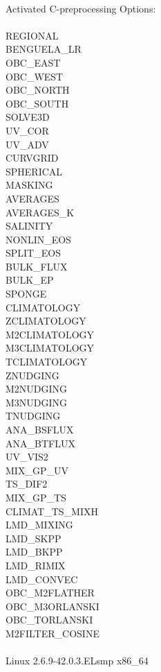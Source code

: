 \\
Activated C-preprocessing Options:\\
\\
REGIONAL\\
BENGUELA\_LR\\
OBC\_EAST\\
OBC\_WEST\\
OBC\_NORTH\\
OBC\_SOUTH\\
SOLVE3D\\
UV\_COR\\
UV\_ADV\\
CURVGRID\\
SPHERICAL\\
MASKING\\
AVERAGES\\
AVERAGES\_K\\
SALINITY\\
NONLIN\_EOS\\
SPLIT\_EOS\\
BULK\_FLUX\\
BULK\_EP\\
SPONGE\\
CLIMATOLOGY\\
ZCLIMATOLOGY\\
M2CLIMATOLOGY\\
M3CLIMATOLOGY\\
TCLIMATOLOGY\\
ZNUDGING\\
M2NUDGING\\
M3NUDGING\\
TNUDGING\\
ANA\_BSFLUX\\
ANA\_BTFLUX\\
UV\_VIS2\\
MIX\_GP\_UV\\
TS\_DIF2\\
MIX\_GP\_TS\\
CLIMAT\_TS\_MIXH\\
LMD\_MIXING\\
LMD\_SKPP\\
LMD\_BKPP\\
LMD\_RIMIX\\
LMD\_CONVEC\\
OBC\_M2FLATHER\\
OBC\_M3ORLANSKI\\
OBC\_TORLANSKI\\
M2FILTER\_COSINE\\
\\
Linux 2.6.9-42.0.3.ELsmp x86\_64\\
